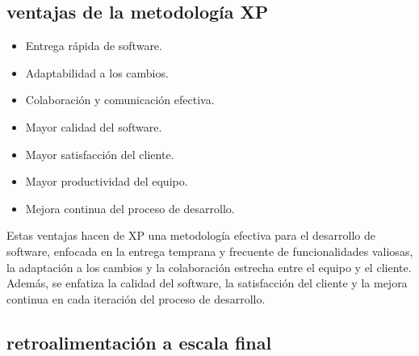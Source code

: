 \documentclass[12pt,a4paper]{article}
\begin{document}
\subsection*{ventajas de la metodología XP}
\begin{itemize}
    \item Entrega rápida de software.
    \item Adaptabilidad a los cambios.
    \item Colaboración y comunicación efectiva.
    \item Mayor calidad del software.
    \item Mayor satisfacción del cliente.
    \item Mayor productividad del equipo.
    \item Mejora continua del proceso de desarrollo.
\end{itemize}
Estas ventajas hacen de XP una metodología efectiva para el desarrollo de software, enfocada en la entrega temprana y frecuente de funcionalidades valiosas, la adaptación a los cambios y la colaboración estrecha entre el equipo y el cliente. Además, se enfatiza la calidad del software, la satisfacción del cliente y la mejora continua en cada iteración del proceso de desarrollo.

\subsection*{retroalimentación a escala final}
\end{document}

